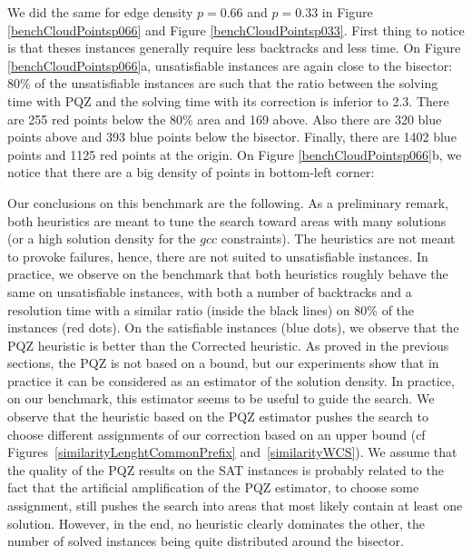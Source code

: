 \documentclass[jair,twoside,11pt,theapa]{article}
\begin{document}

We did the same for edge density $p=0.66$ and $p=0.33$ in Figure \ref{benchCloudPointsp066} and Figure \ref{benchCloudPointsp033}. First thing to notice is that theses instances generally require less backtracks and less time. On Figure \ref{benchCloudPointsp066}a, unsatisfiable instances are again close to the bisector: 80\% of the unsatisfiable instances are such that the ratio between the solving time with PQZ and the solving time with its correction is inferior to 2.3. There are 255 red points below the 80\% area and 169 above. Also there are 320 blue points above and 393 blue points below the bisector. Finally, there are 1402 blue points and 1125 red points at the origin.
On Figure \ref{benchCloudPointsp066}b, we notice that there are a big density of points in bottom-left corner:






Our conclusions on this benchmark are the following. As a preliminary remark, both heuristics are meant to tune the search toward areas with many solutions (or a high solution density for the $gcc$ constraints). The heuristics are not meant to provoke failures, hence, there are not suited to unsatisfiable instances. In practice, we observe on the benchmark that both heuristics roughly behave the same on unsatisfiable instances, with both a number of backtracks and a resolution time with a similar ratio (inside the black lines) on 80\% of the instances (red dots). On the satisfiable instances (blue dots), we observe that the PQZ heuristic is better than the Corrected heuristic. As proved in the previous sections, the PQZ is not based on a bound, but our experiments show that in practice it can be considered as an estimator of the solution density. In practice, on our benchmark, this estimator seems to be useful to guide the search. 
%
We observe that the heuristic based on the PQZ estimator pushes the search to choose different assignments of our correction based on an upper bound (cf Figures~\ref{similarityLenghtCommonPrefix} and~\ref{similarityWCS}). We assume that the quality of the PQZ results on the SAT instances is probably related to the fact that the artificial amplification of the PQZ estimator, to choose some assignment, still pushes the search into areas that most likely contain at least one solution.
%
However, in the end, no heuristic clearly dominates the other, the number of solved instances being quite distributed around the bisector.
  
\end{document}
